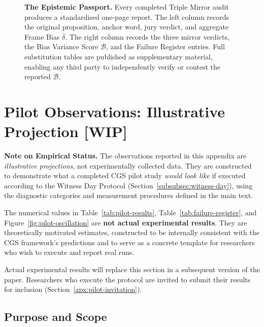 \documentclass[11pt,a4paper]{article}
\theoremstyle{definition}
\theoremstyle{plain}
\theoremstyle{remark}
\begin{document}
\begin{figure}[H]
{\begin{tikzpicture}[
  >={Stealth},
  every node/.style={font=\normalsize}
]
\end{tikzpicture}
}
\caption{%
  \textbf{The Epistemic Passport.}
  Every completed Triple Mirror audit produces a standardised
  one-page report.
  The left column records the original proposition, anchor word,
  jury verdict, and aggregate Frame Bias $\bar\delta$.
  The right column records the three mirror verdicts, the Bias
  Variance Score $\mathcal{B}$, and the Failure Register entries.
  Full substitution tables are published as supplementary material,
  enabling any third party to independently verify or contest
  the reported $\mathcal{B}$.%
}
\label{fig:epistemic-passport}
\end{figure}


\section{Pilot Observations: Illustrative Projection [WIP]}
\label{apx:pilot}

\begin{tcolorbox}[
  colback=cgsgold!8,
  colframe=cgsgold!60,
  arc=6pt,
  boxrule=1.2pt,
  left=10pt, right=10pt, top=8pt, bottom=8pt
]
\textbf{\color{cgsgold!80!black}Note on Empirical Status.}\quad
The observations reported in this appendix are
\emph{illustrative projections}, not experimentally collected data.
They are constructed to demonstrate what a completed CGS pilot study
\emph{would look like} if executed according to the Witness Day Protocol
(Section~\cref{subsubsec:witness-day}), using the diagnostic categories
and measurement procedures defined in the main text.

The numerical values in Table~\cref{tab:pilot-results},
Table~\cref{tab:failure-register}, and
Figure~\cref{fig:pilot-oscillation} are \textbf{not actual experimental
results}.
They are theoretically motivated estimates, constructed to be
internally consistent with the CGS framework's predictions
and to serve as a concrete template for researchers who wish
to execute and report real runs.

Actual experimental results will replace this section in a
subsequent version of the paper.
Researchers who execute the protocol are invited to submit
their results for inclusion (Section~\cref{apx:pilot-invitation}).
\end{tcolorbox}


\subsection*{Purpose and Scope}
\end{document}
